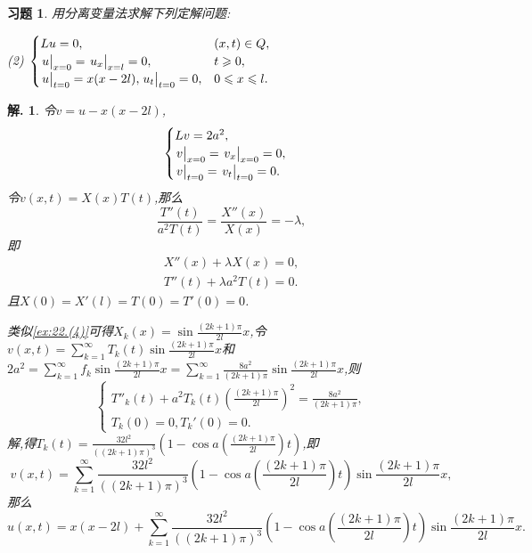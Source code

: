 \documentclass[a4paper,oneside,12pt]{ctexart}
\theoremstyle{plain}
\newtheorem{exercise}{习题}
\theoremstyle{nonumberplain}
\newtheorem{solution}{解.}
\theoremstyle{nonumberplain}
\begin{document}
    \begin{exercise}
        \label{ex:23.(2)}
        用分离变量法求解下列定解问题:

        (2) $\begin{cases}
            Lu=0, & (x,t)\in Q,\\
            \eval{u}_{x=0}=\eval{u_x}_{x=l}=0, & t\geqslant 0,\\
            \eval{u}_{t=0}=x(x-2l),\eval{u_t}_{t=0}=0, & 0\leqslant x\leqslant l.
        \end{cases}$
    \end{exercise}

    \begin{solution}
        令$v=u-x(x-2l)$, 
        \begin{equation*}
            \begin{cases}
                Lv=2a^2,\\
                \eval{v}_{x=0}=\eval{v_x}_{x=0}=0,\\
                \eval{v}_{t=0}=\eval{v_t}_{t=0}=0.
            \end{cases}
        \end{equation*}
        令$v(x,t)=X(x)T(t)$,那么 
        \begin{equation*}
            \frac{T''(t)}{a^2T(t)}=\frac{X''(x)}{X(x)}=-\lambda,
        \end{equation*}
        即 
        \begin{gather*}
            X''(x)+\lambda X(x)=0,\\
            T''(t)+\lambda a^2 T(t)=0.
        \end{gather*}
        且$X(0)=X'(l)=T(0)=T'(0)=0$.

        类似\cref{ex:22.(4)}可得$X_k(x)=\sin\frac{(2k+1)\pi}{2l}x$,令$v(x,t)=\sum_{k=1}^\infty T_k(t)\sin\frac{(2k+1)\pi}{2l}x$和
        $2a^2=\sum_{k=1}^\infty f_k\sin\frac{(2k+1)\pi}{2l}x=\sum_{k=1}^\infty \frac{8a^2}{(2k+1)\pi}\sin\frac{(2k+1)\pi}{2l}x$,则 
        \begin{equation*}
            \begin{cases}
                T''_k(t)+a^2T_k(t)\left(\frac{(2k+1)\pi}{2l}\right)^2=\frac{8a^2}{(2k+1)\pi},\\
                T_k(0)=0,T_k'(0)=0.
            \end{cases}
        \end{equation*}
        解,得$T_k(t)=\frac{32l^2}{((2k+1)\pi)^3}\left(1-\cos a\left(\frac{(2k+1)\pi}{2l}\right)t\right)$,即 
        \begin{equation*}
            v(x,t)=\sum_{k=1}^\infty \frac{32l^2}{((2k+1)\pi)^3}\left(1-\cos a\left(\frac{(2k+1)\pi}{2l}\right)t\right)\sin\frac{(2k+1)\pi}{2l}x,
        \end{equation*}
        那么
        \begin{equation*}
            u(x,t)=x(x-2l)+\sum_{k=1}^\infty \frac{32l^2}{((2k+1)\pi)^3}\left(1-\cos a\left(\frac{(2k+1)\pi}{2l}\right)t\right)\sin\frac{(2k+1)\pi}{2l}x.
        \end{equation*}
    \end{solution}
\end{document}
